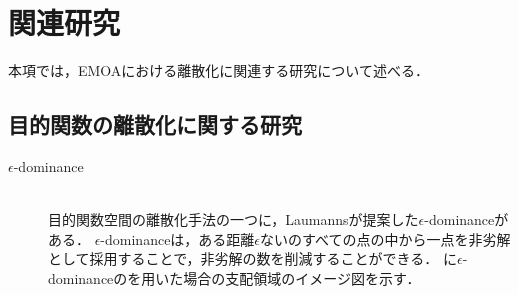 \documentclass[../main/main]{subfiles}
\begin{document}
\chapter{関連研究}
本項では，EMOAにおける離散化に関連する研究について述べる．

\section{目的関数の離散化に関する研究}
\begin{description}
\item[$\epsilon$-dominance]\mbox{}\\
\quad 目的関数空間の離散化手法の一つに，Laumannsが提案した$\epsilon$-dominance\cite{Laumanns2002Combining}がある．
$\epsilon$-dominanceは，ある距離$\epsilon$ないのすべての点の中から一点を非劣解として採用することで，非劣解の数を削減することができる．
に$\epsilon$-dominanceのを用いた場合の支配領域のイメージ図を示す．


\end{description}
\end{document}
